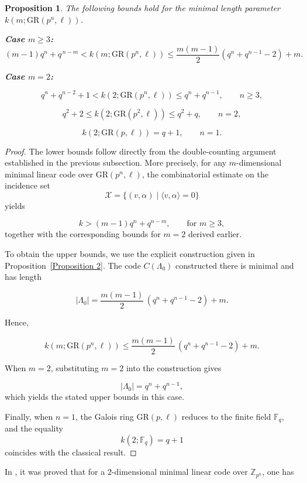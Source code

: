 \documentclass[10pt]{article}
\newtheorem{prop}[lem]{Proposition}
\theoremstyle{definition}
\begin{document}
\begin{prop}
The following bounds hold for the minimal length parameter
\( k(m;\mathrm{GR}(p^{n},\ell)) \).

\medskip
\noindent
\textbf{Case \( m \ge 3 \):}
\[
(m-1)q^{n} + q^{\,n-m}
<
k(m;\mathrm{GR}(p^{n},\ell))
\le
\frac{m(m-1)}{2} (q^n + q^{n-1} - 2) + m.
\]

\medskip
\noindent
\textbf{Case \( m = 2 \):}

\[
q^{n} + q^{n-2} + 1
<
k(2;\mathrm{GR}(p^{n},\ell))
\le
q^{n}+q^{n-1},
\qquad n \ge 3,
\]

\[
q^{2} + 2
\le
k(2;\mathrm{GR}(p^{2},\ell))
\le
q^{2}+q,
\qquad n=2,
\]

\[
k(2;\mathrm{GR}(p,\ell)) = q+1,
\qquad n=1.
\]
\end{prop}


\begin{proof}
The lower bounds follow directly from the double-counting argument established in the previous subsection.
More precisely, for any $m$-dimensional minimal linear code over $\mathrm{GR}(p^{n},\ell)$, the combinatorial estimate on the incidence set
\[
\mathcal{X}=\{(v,\alpha)\mid \langle v,\alpha\rangle=0\}
\]
yields

\[
k >
(m-1)q^{n} + q^{n-m},
\qquad \text{for } m \ge 3,
\]
together with the corresponding bounds for $m=2$ derived earlier.

\medskip
To obtain the upper bounds, we use the explicit construction given in Proposition~\ref{Proposition 2}.
The code \( C(\Lambda_0) \) constructed there is minimal and has length

\[
|\Lambda_0|
=
\frac{m(m-1)}{2}\,(q^{n}+q^{n-1}-2)+m.
\]

Hence,

\[
k(m;\mathrm{GR}(p^{n},\ell))
\le
\frac{m(m-1)}{2}\,(q^{n}+q^{n-1}-2)+m.
\]

\medskip
When \( m=2 \), substituting \( m=2 \) into the construction gives

\[
|\Lambda_0|
=
q^{n}+q^{n-1},
\]
which yields the stated upper bounds in this case.

\medskip
Finally, when \( n=1 \), the Galois ring $\mathrm{GR}(p,\ell)$ reduces to the finite field $\mathbb{F}_q$, and the equality
\[
k(2;\mathbb{F}_q)=q+1
\]
coincides with the classical result.
\end{proof}


In \cite{ChatterjeeMesnagerMishra}, it was proved that for a $2$-dimensional minimal linear code over $\mathbb{Z}_{p^n}$, one has
\end{document}
